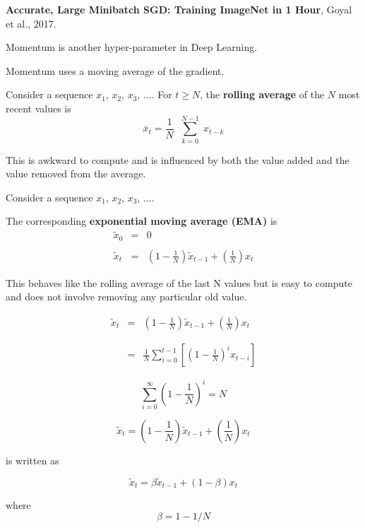 {\vfill
{\bf Accurate, Large Minibatch SGD: Training ImageNet in 1 Hour}, Goyal et al., 2017.



Momentum is another hyper-parameter in Deep Learning.

\vfill
Momentum uses a moving average of the gradient.

\vfill
Consider a sequence $x_1$, $x_2$, $x_3$, $\ldots$.
\vfill
For $t \geq N$, the {\bf rolling average} of the $N$ most recent values is
$$\overline{x}_t = \frac{1}{N} \;\; \sum_{k = 0}^{N-1}\; x_{t-k}$$

\vfill
This is awkward to compute and is influenced by both the value added and the value removed from the average.


\vfill
Consider a sequence $x_1$, $x_2$, $x_3$, $\ldots$.

\vfill
The corresponding {\bf exponential moving average (EMA)} is
\begin{eqnarray*}
\tilde{x}_0 & = & 0 \\
\\
\tilde{x}_t & = & \left(1-\frac{1}{N}\right)\tilde{x}_{t-1} + \left(\frac{1}{N}\right)x_t
\end{eqnarray*}

\vfill
This behaves like the rolling average of the last N values but is easy to compute and does not involve removing any particular old value.

\begin{eqnarray*}
\tilde{x}_t & = & \left(1-\frac{1}{N}\right)\tilde{x}_{t-1} + \left(\frac{1}{N}\right)x_t \\
\\
\\
&= & \frac{1}{N}\sum_{i=0}^{t-1} \left[\left(1-\frac{1}{N}\right)^i x_{t-i}\right]
\end{eqnarray*}

\vfill
$$\sum_{i=0}^\infty \left(1-\frac{1}{N}\right)^i = N$$


$$\tilde{x}_t = \left(1-\frac{1}{N}\right)\tilde{x}_{t-1} + \left(\frac{1}{N}\right)x_t$$

\vfill
is written as

$$\tilde{x}_t = \beta\tilde{x}_{t-1} + (1-\beta)x_t$$

\vfill
where
$$\beta = 1 - 1/N$$

}
